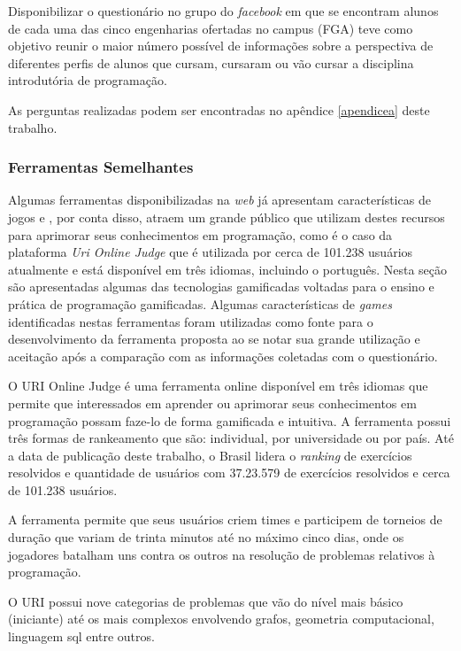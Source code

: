 Disponibilizar o questionário no grupo do \textit{facebook} em que se encontram alunos de cada uma das cinco engenharias ofertadas no campus (FGA)
teve como objetivo reunir o maior número possível de informações sobre a perspectiva de diferentes perfis de alunos que cursam, cursaram ou vão
cursar a disciplina introdutória de programação.


As perguntas realizadas podem ser encontradas no apêndice \ref{apendicea} deste trabalho.

\subsubsection{Ferramentas Semelhantes}
Algumas ferramentas disponibilizadas na \textit{web} já apresentam características de jogos e , por conta disso,
atraem um grande público que utilizam destes recursos para aprimorar seus conhecimentos em programação, como é
o caso da plataforma \textit{Uri Online Judge} que é utilizada por cerca de 101.238 usuários atualmente e está disponível em três
idiomas, incluindo o português.
Nesta seção são apresentadas algumas das tecnologias gamificadas voltadas para o ensino e prática de programação
gamificadas. Algumas características de \textit{games} identificadas nestas ferramentas foram utilizadas como fonte
para o desenvolvimento da ferramenta proposta ao se notar sua grande utilização e aceitação após a comparação com as 
informações coletadas com o questionário.

O URI Online Judge é uma ferramenta online disponível em três idiomas que permite que interessados em aprender ou
aprimorar seus conhecimentos em programação possam faze-lo de forma gamificada e intuitiva. A ferramenta possui três
formas de rankeamento que são: individual, por universidade ou por país. Até a data de publicação deste trabalho, o Brasil
lidera o \textit{ranking} de exercícios resolvidos e quantidade de usuários com 37.23.579 de exercícios resolvidos e cerca
de 101.238 usuários. \cite{URI} 

A ferramenta permite que seus usuários criem times e participem de torneios de duração que variam de trinta minutos até no 
máximo cinco dias, onde os jogadores batalham uns contra os outros na resolução de problemas relativos à programação.

O URI possui nove categorias de problemas que vão do nível mais básico (iniciante) até os mais complexos envolvendo grafos,
geometria computacional, linguagem sql entre outros.


